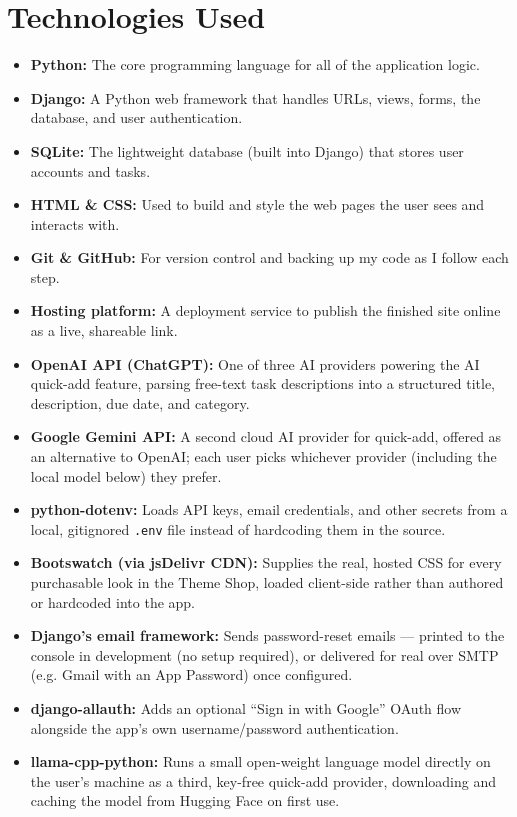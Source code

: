 \documentclass[11pt]{article}
\begin{document}
\section{Technologies Used}
\begin{itemize}
  \item \textbf{Python:} The core programming language for all of the application logic.
  \item \textbf{Django:} A Python web framework that handles URLs, views, forms, the database, and user authentication.
  \item \textbf{SQLite:} The lightweight database (built into Django) that stores user accounts and tasks.
  \item \textbf{HTML \& CSS:} Used to build and style the web pages the user sees and interacts with.
  \item \textbf{Git \& GitHub:} For version control and backing up my code as I follow each step.
  \item \textbf{Hosting platform:} A deployment service to publish the finished site online as a live, shareable link.
  \item \textbf{OpenAI API (ChatGPT):} One of three AI providers powering the AI quick-add feature, parsing free-text task descriptions into a structured title, description, due date, and category.
  \item \textbf{Google Gemini API:} A second cloud AI provider for quick-add, offered as an alternative to OpenAI; each user picks whichever provider (including the local model below) they prefer.
  \item \textbf{python-dotenv:} Loads API keys, email credentials, and other secrets from a local, gitignored \texttt{.env} file instead of hardcoding them in the source.
  \item \textbf{Bootswatch (via jsDelivr CDN):} Supplies the real, hosted CSS for every purchasable look in the Theme Shop, loaded client-side rather than authored or hardcoded into the app.
  \item \textbf{Django's email framework:} Sends password-reset emails --- printed to the console in development (no setup required), or delivered for real over SMTP (e.g. Gmail with an App Password) once configured.
  \item \textbf{django-allauth:} Adds an optional ``Sign in with Google'' OAuth flow alongside the app's own username/password authentication.
  \item \textbf{llama-cpp-python:} Runs a small open-weight language model directly on the user's machine as a third, key-free quick-add provider, downloading and caching the model from Hugging Face on first use.
\end{itemize}
\end{document}

